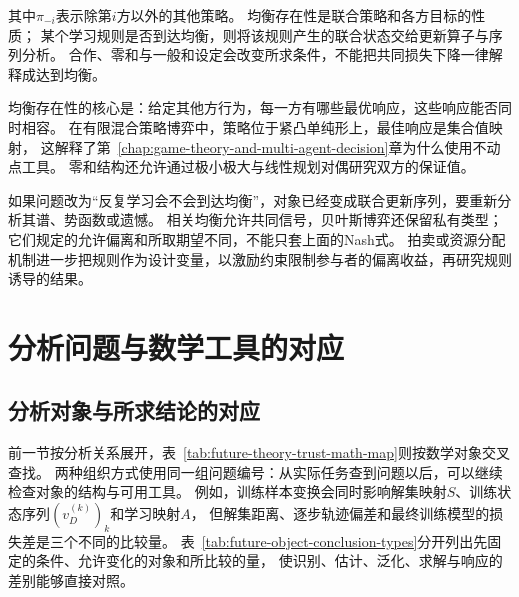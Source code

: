 其中$\pi_{-i}$表示除第$i$方以外的其他策略。
均衡存在性是联合策略和各方目标的性质；
某个学习规则是否到达均衡，则将该规则产生的联合状态交给更新算子与序列分析。
合作、零和与一般和设定会改变所求条件，不能把共同损失下降一律解释成达到均衡。

均衡存在性的核心是：给定其他方行为，每一方有哪些最优响应，这些响应能否同时相容。
在有限混合策略博弈中，策略位于紧凸单纯形上，最佳响应是集合值映射，
这解释了第~\ref{chap:game-theory-and-multi-agent-decision}章为什么使用不动点工具。
零和结构还允许通过极小极大与线性规划对偶研究双方的保证值。

如果问题改为“反复学习会不会到达均衡”，对象已经变成联合更新序列，要重新分析其谱、势函数或遗憾。
相关均衡允许共同信号，贝叶斯博弈还保留私有类型；它们规定的允许偏离和所取期望不同，不能只套上面的Nash式。
拍卖或资源分配机制进一步把规则作为设计变量，以激励约束限制参与者的偏离收益，再研究规则诱导的结果。

\section{分析问题与数学工具的对应}
\label{sec:future-mathematical-tool-roles}

\subsection{分析对象与所求结论的对应}
\label{sec:future-object-conclusion-correspondence}

前一节按分析关系展开，表~\ref{tab:future-theory-trust-math-map}则按数学对象交叉查找。
两种组织方式使用同一组问题编号：从实际任务查到问题以后，可以继续检查对象的结构与可用工具。
例如，训练样本变换会同时影响解集映射$S$、训练状态序列$(v_D^{(k)})_k$和学习映射$A$，
但解集距离、逐步轨迹偏差和最终训练模型的损失差是三个不同的比较量。
表~\ref{tab:future-object-conclusion-types}分开列出先固定的条件、允许变化的对象和所比较的量，
使识别、估计、泛化、求解与响应的差别能够直接对照。

